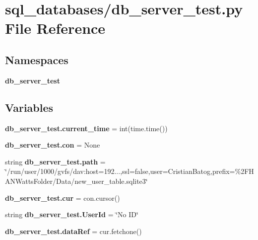 \section{sql\+\_\+databases/db\+\_\+server\+\_\+test.py File Reference}
\label{db__server__test_8py}
\subsection*{Namespaces}
\begin{DoxyCompactItemize}
\item 
 \textbf{ db\+\_\+server\+\_\+test}
\end{DoxyCompactItemize}
\subsection*{Variables}
\begin{DoxyCompactItemize}
\item 
\textbf{ db\+\_\+server\+\_\+test.\+current\+\_\+time} = int(time.\+time())
\item 
\textbf{ db\+\_\+server\+\_\+test.\+con} = None
\item 
string \textbf{ db\+\_\+server\+\_\+test.\+path} = \char`\"{}/run/user/1000/gvfs/dav\+:host=192...,ssl=false,user=Cristian\+Batog,prefix=\%2\+F\+H\+A\+N\+Watts\+Folder/\+Data/new\+\_\+user\+\_\+table.\+sqlite3\char`\"{}
\item 
\textbf{ db\+\_\+server\+\_\+test.\+cur} = con.\+cursor()
\item 
string \textbf{ db\+\_\+server\+\_\+test.\+User\+Id} = \char`\"{}No ID\char`\"{}
\item 
\textbf{ db\+\_\+server\+\_\+test.\+data\+Ref} = cur.\+fetchone()
\end{DoxyCompactItemize}
